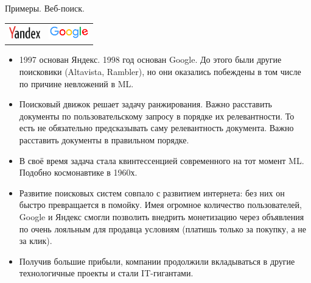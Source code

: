 \documentclass[9pt]{beamer}
\begin{document}
\begin{frame}{Примеры. Веб-поиск.}
\begin{tabular}{>{\centering\arraybackslash}m{}>{\centering\arraybackslash}m{}}
     \includegraphics[height=20px]{img/intro_yandex.png}
     &\vspace{10px}\includegraphics[height=25px]{img/intro_google.png}
\end{tabular}

\begin{itemize}
    \item 1997 основан Яндекс. 1998 год основан Google. До этого были другие поисковики (Altavista, Rambler), но они оказались побеждены в том числе по причине невложений в ML.
    \item Поисковый движок решает задачу ранжирования. Важно расставить документы по пользовательскому запросу в порядке их релевантности. То есть не обязательно предсказывать саму релевантность документа. Важно расставить документы в правильном порядке.
    \item В своё время задача стала квинтессенцией современного на тот момент ML. Подобно космонавтике в 1960х.
    \item Развитие поисковых систем совпало с развитием интернета: без них он быстро превращается в помойку. Имея огромное количество пользователей, Google и Яндекс смогли позволить внедрить монетизацию через объявления по очень лояльным для продавца условиям (платишь только за покупку, а не за клик).
    \item Получив большие прибыли, компании продолжили вкладываться в другие технологичные проекты и стали IT-гигантами.
\end{itemize}
\end{frame}
\end{document}
